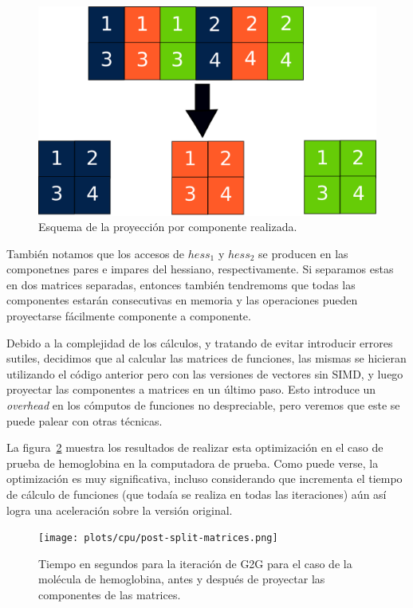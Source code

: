 \begin{figure}[htbp]
   \centering
   \includegraphics[width=\plotwidth]{images/matrix-split-img.png}
   \caption{Esquema de la proyecci\'on por componente realizada.}
   \label{fig:matrix-split-img}
\end{figure}

Tambi\'en notamos que los accesos de $hess_1$ y $hess_2$ se producen en las componetnes
pares e impares del hessiano, respectivamente. Si separamos estas en dos matrices
separadas, entonces tambi\'en tendremoms que todas las componentes estar\'an
consecutivas en memoria y las operaciones pueden proyectarse f\'acilmente componente
a componente.

Debido a la complejidad de los c\'alculos, y tratando de evitar introducir
errores sutiles, decidimos que al calcular las matrices de funciones, las
mismas se hicieran utilizando el c\'odigo  anterior pero con las versiones de
vectores sin SIMD, y luego proyectar las componentes a matrices en un \'ultimo
paso. Esto introduce un \textit{overhead} en los c\'omputos de funciones no
despreciable, pero veremos que este se puede palear con otras t\'ecnicas.

La figura~\ref{fig:lio-post-partir-mats} muestra los resultados de realizar esta
optimizaci\'on en el caso de prueba de hemoglobina en la computadora de prueba.
Como puede verse, la optimizaci\'on es muy significativa, incluso considerando
que incrementa el tiempo de c\'alculo de funciones (que toda\'ia se realiza en
todas las iteraciones) a\'un as\'i logra una aceleraci\'on sobre la versi\'on
original.

\begin{figure}[htbp]
   \centering
   \texttt{[image: plots/cpu/post-split-matrices.png]}
   \caption{Tiempo en segundos para la iteraci\'on de G2G para el caso de la
   mol\'ecula de hemoglobina, antes y despu\'es de proyectar las componentes
   de las matrices.}
   \label{fig:lio-post-partir-mats}
\end{figure}

